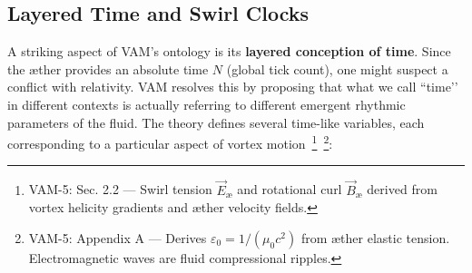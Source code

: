 \documentclass[a4paper,12pt]{article}
\begin{document}
    \subsection{Layered Time and Swirl Clocks}
    A striking aspect of VAM’s ontology is its \textbf{layered conception of time}. Since the æther provides an absolute time $N$ (global tick count), one might suspect a conflict with relativity. VAM resolves this by proposing that what we call ``time’’ in different contexts is actually referring to different emergent rhythmic parameters of the fluid. The theory defines several time-like variables, each corresponding to a particular aspect of vortex motion~\footnote{VAM-5: Sec. 2.2 — Swirl tension $\vec{E}_{\text{\ae}}$ and rotational curl $\vec{B}_{\text{\ae}}$ derived from vortex helicity gradients and æther velocity fields.}~\footnote{VAM-5: Appendix A — Derives $\varepsilon_0 = 1/(\mu_0 c^2)$ from æther elastic tension. Electromagnetic waves are fluid compressional ripples.}:
\end{document}
